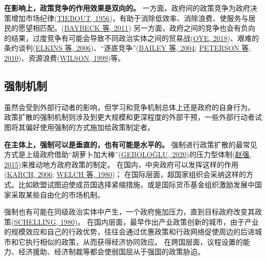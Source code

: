 \documentclass[
  12pt,
]{ctexart}
\begin{document}
\textbf{在影响上，政策竞争的作用效果是双向的。}
一方面，政府间的政策竞争为政府决策增加市场纪律(\protect\hyperlink{ref-Tiebout1956}{TIEBOUT, 1956})，有助于消除低效率、消除浪费、使服务与居民的愿望相匹配。(\protect\hyperlink{ref-BaybeckEtAl2011}{BAYBECK 等, 2011})
另一方面，政府之间的竞争也会有负向的结果，过度竞争有可能会导致不同政治实体之间的贸易战(\protect\hyperlink{ref-Oye2018}{OYE, 2018})、艰难的条约谈判(\protect\hyperlink{ref-ElkinsEtAl2006}{ELKINS 等, 2006})、``逐底竞争''(\protect\hyperlink{ref-BaileyRom2004}{BAILEY 等, 2004}; \protect\hyperlink{ref-PetersonRom2010}{PETERSON 等, 2010})、资源浪费(\protect\hyperlink{ref-Wilson1999}{WILSON, 1999})等。

\hypertarget{ux5f3aux5236ux673aux5236}{%
\subsection{强制机制}\label{ux5f3aux5236ux673aux5236}}

虽然会受到外部行动者的影响，但学习和竞争机制总体上还是政府的自身行为。
政策扩散的强制机制则涉及到更大规模和更深程度的外部干预，一些外部行动者试图将其偏好使用强制的方式施加给政策制定者。

\textbf{在主体上，强制可以是垂直的，也有可能是水平的。}
强制进行政策扩散的最常见方式是上级政府借助``胡萝卜加大棒''(\protect\hyperlink{ref-Gebologlu2020}{GEBOLOĞLU, 2020})的压力型体制(\protect\hyperlink{ref-ZhaoQiang2015}{赵强, 2015})来推动地方政府政策的制定。
在国内，中央政府可以发挥这样的作用(\protect\hyperlink{ref-Karch2006}{KARCH, 2006}; \protect\hyperlink{ref-WelchThompson1980}{WELCH 等, 1980})；
在国际层面，超国家组织会采纳这样的方式。比如欧盟试图迫使成员国选择紧缩措施，或是国际货币基金组织激励发展中国家采取某些自由化的市场机制。

强制也有可能在同级政治实体中产生，一个政府施加压力，直到目标政府改变其政策(\protect\hyperlink{ref-Schelling1980}{SCHELLING, 1980})。
在国内层面，最早作出产业政策创新的城市，由于产业的规模效应和自己的行政优势，往往会通过优惠政策和行政网络促使周边的后进城市和它执行相似的政策，从而获得经济协同效应。
在跨国层面，议程设置的能力、经济援助、经济制裁等都会使弱国屈从于强国的政策胁迫。
\end{document}
